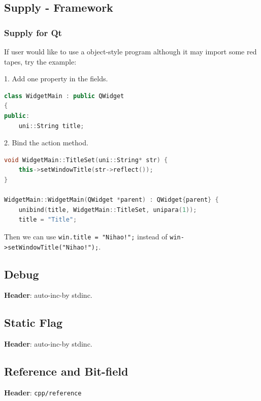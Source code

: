 \subsection{Supply \mbox{-} Framework}



\subsubsection{Supply for Qt}

If user would like to use a object-style program although it may import some red tapes, try the example:

1. Add one property in the fields.

\begin{lstlisting}[language=C++]
class WidgetMain : public QWidget
{
public:
	uni::String title;
\end{lstlisting}

2. Bind the action method.

\begin{lstlisting}[language=C++]
void WidgetMain::TitleSet(uni::String* str) {
	this->setWindowTitle(str->reflect());
}

WidgetMain::WidgetMain(QWidget *parent) : QWidget{parent} {
	unibind(title, WidgetMain::TitleSet, unipara(1));
	title = "Title";
\end{lstlisting}

Then we can use \verb|win.title = "Nihao!";| instead of \verb|win->setWindowTitle("Nihao!");|.



\subsection{Debug}

\textbf{Header}: auto-inc-by stdinc.



\subsection{Static Flag}

\textbf{Header}: auto-inc-by stdinc.



\subsection{Reference and Bit-field}

\textbf{Header}: \verb|cpp/reference|

